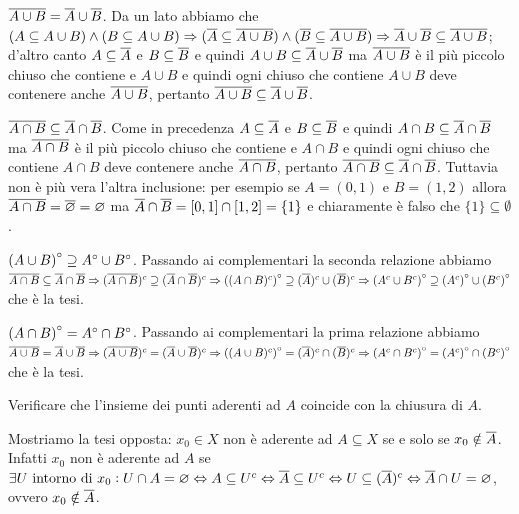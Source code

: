 \documentclass[a4paper]{article}\par \usepackage{style}\par
\begin{document}
\begin{es}
\end{es}\par $ \overline{A \cup B} = \overline{A} \cup \overline{B} $. Da un lato abbiamo che $ (A \subseteq A \cup B) \wedge (B \subseteq A \cup B) \Rightarrow (\overline{A} \subseteq \overline{A \cup B}) \wedge (\overline{B} \subseteq \overline{A \cup B}) \Rightarrow \overline{A} \cup \overline{B} \subseteq \overline{A \cup B} $; d'altro canto $ A \subseteq \overline{A} $ e $ B \subseteq \overline{B} $ e quindi $ A \cup B \subseteq \overline{A} \cup \overline{B} $ ma $ \overline{A \cup B} $ è il più piccolo chiuso che contiene e $ A \cup B $ e quindi ogni chiuso che contiene $ A \cup B $ deve contenere anche $ \overline{A \cup B} $, pertanto $ \overline{A \cup B} \subseteq \overline{A} \cup \overline{B} $. \\\par $ \overline{A \cap B} \subseteq \overline{A} \cap \overline{B} $. Come in precedenza $ A \subseteq \overline{A} $ e $ B \subseteq \overline{B} $ e quindi $ A \cap B \subseteq \overline{A} \cap \overline{B} $ ma $ \overline{A \cap B} $ è il più piccolo chiuso che contiene e $ A \cap B $ e quindi ogni chiuso che contiene $ A \cap B $ deve contenere anche $ \overline{A \cap B} $, pertanto $ \overline{A \cap B} \subseteq \overline{A} \cap \overline{B} $. Tuttavia non è più vera l'altra inclusione: per esempio se $ A = (0, 1) $ e $ B = (1, 2) $ allora $ \overline{A \cap B} = \overline{\varnothing} = \varnothing $ ma $ \overline{A} \cap \overline{B} = [0, 1] \cap [1, 2] = \{1\} $ e chiaramente è falso che $ \{1\} \subseteq \emptyset $. \\\par $ {(A \cup B)}^{\circ} \supseteq {A}^{\circ} \cup {B}^{\circ} $. Passando ai complementari la seconda relazione abbiamo $ \overline{A \cap B} \subseteq \overline{A} \cap \overline{B} \Rightarrow (\overline{A \cap B})^c \supseteq (\overline{A} \cap \overline{B})^c \Rightarrow {((A \cap B)^c)}^{\circ} \supseteq (\overline{A})^c \cup (\overline{B})^c \Rightarrow {(A^c \cup B^c)}^{\circ} \supseteq {(A^c)}^{\circ} \cup {(B^c)}^{\circ} $ che è la tesi. \\\par $ {(A \cap B)}^{\circ} = {A}^{\circ} \cap {B}^{\circ} $. Passando ai complementari la prima relazione abbiamo $ \overline{A \cup B} = \overline{A} \cup \overline{B} \Rightarrow (\overline{A \cup B})^c = (\overline{A} \cup \overline{B})^c \Rightarrow {((A \cup B)^c)}^{\circ} = (\overline{A})^c \cap (\overline{B})^c \Rightarrow {(A^c \cap B^c)}^{\circ} = {(A^c)}^{\circ} \cap {(B^c)}^{\circ} $ che è la tesi.\par \begin{es}
  Verificare che l'insieme dei punti aderenti ad $ A $ coincide con la chiusura di $ A $.
\end{es}\par Mostriamo la tesi opposta: $ x_0 \in X $ non è aderente ad $ A \subseteq X $ se e solo se $ x_0 \notin \overline{A} $. Infatti $ x_0 $ non è aderente ad $ A $ se $ \exists U \text{ intorno di } x_0 : U \cap A = \varnothing \Leftrightarrow A \subseteq U^c \Leftrightarrow \overline{A} \subseteq U^c \Leftrightarrow U \subseteq (\overline{A})^c \Leftrightarrow \overline{A} \cap U = \varnothing $, ovvero $ x_0 \notin \overline{A} $.\par \begin{es}

\end{es}
\end{document}
